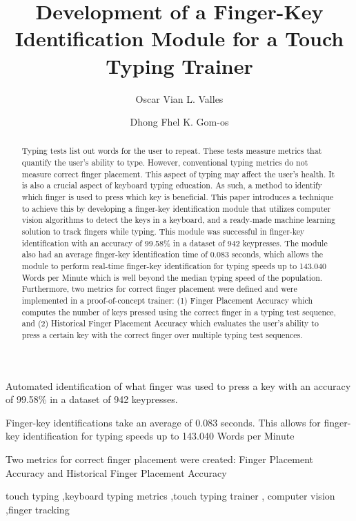\documentclass[preprint,12pt,authoryear]{elsarticle}
\begin{document}
\begin{frontmatter}
	\title{Development of a Finger-Key Identification Module for a Touch Typing Trainer}
	\author[inst1]{Oscar Vian L. Valles}
	\author[inst1]{Dhong Fhel K. Gom-os}


	\begin{abstract}
		Typing tests list out words for the user to repeat. These tests measure metrics
		that quantify the user's ability to type. However, conventional typing metrics
		do not measure correct finger placement. This aspect of typing may affect the
		user's health. It is also a crucial aspect of keyboard typing education. As
		such, a method to identify which finger is used to press which key is
		beneficial. This paper introduces a technique to achieve this by developing a
		finger-key identification module that utilizes computer vision algorithms to
		detect the keys in a keyboard, and a ready-made machine learning solution to
		track fingers while typing. This module was successful in finger-key
		identification with an accuracy of 99.58\% in a dataset of 942 keypresses. The
		module also had an average finger-key identification time of 0.083 seconds,
		which allows the module to perform real-time finger-key identification for
		typing speeds up to 143.040 Words per Minute which is well beyond the median
		typing speed of the population. Furthermore, two metrics for correct finger
		placement were defined and were implemented in a proof-of-concept trainer: (1)
		Finger Placement Accuracy which computes the number of keys pressed using the
		correct finger in a typing test sequence, and (2) Historical Finger Placement
		Accuracy which evaluates the user's ability to press a certain key with the
		correct finger over multiple typing test sequences.
	\end{abstract}

	\begin{highlights}
		\item Automated identification of what finger was used to press a key with
		an accuracy of 99.58\% in a dataset of 942 keypresses.
		\item Finger-key identifications take an average of 0.083 seconds. This
			allows for finger-key identification for typing speeds up to 143.040 Words
			per Minute
		\item Two metrics for correct finger placement were created: Finger
		Placement Accuracy and Historical Finger Placement Accuracy
	\end{highlights}

	\begin{keyword}
		touch typing \sep keyboard typing metrics \sep touch typing trainer \sep
		computer vision \sep finger tracking
	\end{keyword}

\end{frontmatter}
\end{document}
